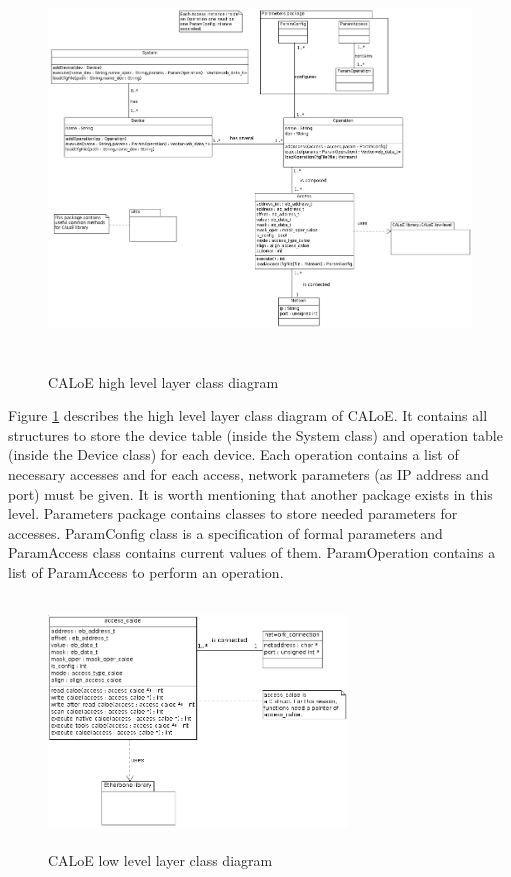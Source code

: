 \begin{figure}[H]
\centering
\includegraphics[width=450px,height=400px]{img/high_level_class_diagram.png}
\caption{CALoE high level layer class diagram}
\label{caloe_hl_cd_img}
\end{figure}

Figure \ref{caloe_hl_cd_img} describes the high level layer class diagram of CALoE. It contains all structures
to store the device table (inside the System class) and operation table (inside the Device class) for each device. Each operation contains
a list of necessary accesses and for each access, network parameters (as IP address and port) must be given. 
It is worth mentioning that another package exists in this level. Parameters package
contains classes to store needed parameters for accesses. ParamConfig class is a specification of formal parameters and 
ParamAccess class contains current values of them. ParamOperation contains a list of ParamAccess to perform an operation.

\begin{figure}[H]
\centering
\includegraphics[width=300px,height=250px]{img/low_level_class_diagram.png}
\caption{CALoE low level layer class diagram}
\label{caloe_ll_cd_img}
\end{figure}

